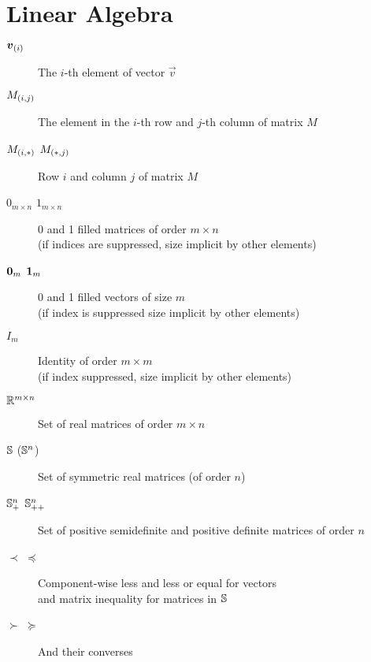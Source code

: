 \documentclass[../main.tex]{subfiles}
\begin{document}
\section*{Linear Algebra}
\begin{description}

  \item[${\elem[i]{\vec{v}}}$] The $i$-th element of vector $\vec{v}$
  \item[${\elem[i,j]{M}}$] The element in the $i$-th row and $j$-th column of matrix $M$
  \item[${\elem[i,*]{M}}$ ${\elem[*,j]{M}}$] Row $i$ and column $j$ of matrix $M$
  \item[$0_{m\times n}$ $1_{m\times n}$] 0 and 1 filled matrices of order $m\times n$ \\(if indices are suppressed, size implicit by other elements)
  \item[$\0_{m}$ $\1_{m}$] 0 and 1 filled vectors of size $m$ \\(if index is suppressed size implicit by other elements)
  \item[$I_{m}$] Identity of order $m\times m$ \\(if index suppressed, size implicit by other elements)
  \item[$\R^{m\times n}$] Set of real matrices of order $m\times n$
  \item[$\symmetric$ ($\symmetric^{n}$)] Set of symmetric real matrices (of order $n$)
  \item[$\semidefpos^{n}$ $\defpos^{n}$] Set of positive semidefinite and positive definite matrices of order $n$
  \item[$\prec$ $\preceq$] Component-wise less and less or equal for vectors \\and matrix inequality for matrices in $\symmetric$
  \item[$\succ$ $\succeq$] And their converses


\end{description}
\end{document}
